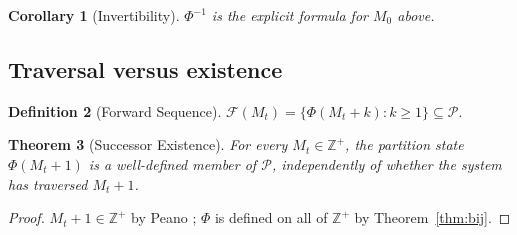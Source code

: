 \documentclass[twocolumn,10pt,a4paper]{article}
\theoremstyle{thmstyle}
\newtheorem{theorem}{Theorem}[section]
\newtheorem{corollary}[theorem]{Corollary}
\theoremstyle{definition}
\newtheorem{definition}[theorem]{Definition}
\theoremstyle{remark}
\newcommand{\Zp}{\mathbb{Z}^{+}}
\newcommand{\Parts}{\mathcal{P}}
\newcommand{\PhiMap}{\varPhi}
\newcommand{\calF}{\mathcal{F}}
\begin{document}
\begin{corollary}[Invertibility]
\label{cor:inv}
$\PhiMap^{-1}$ is the explicit formula for $M_{0}$ above.
\end{corollary}

\subsection{Traversal versus existence}

\begin{definition}[Forward Sequence]
\label{def:forward}
$\calF(M_{t})=\{\PhiMap(M_{t}+k):k\geq 1\}\subseteq\Parts$.
\end{definition}

\begin{theorem}[Successor Existence]
\label{thm:succ}
For every $M_{t}\in\Zp$, the partition state $\PhiMap(M_{t}+1)$ is a
well-defined member of $\Parts$, independently of whether the system
has traversed $M_{t}+1$.
\end{theorem}

\begin{proof}
$M_{t}+1\in\Zp$ by Peano \citep{peano1889}; $\PhiMap$ is defined on
all of $\Zp$ by Theorem~\ref{thm:bij}.
\end{proof}
\end{document}

